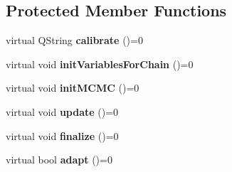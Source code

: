 \subsection*{Protected Member Functions}
\begin{DoxyCompactItemize}
\item 
\hypertarget{class_m_c_m_c_loop_a811448d75f58895a01abb4eb48967fd8}{virtual Q\-String {\bfseries calibrate} ()=0}\label{class_m_c_m_c_loop_a811448d75f58895a01abb4eb48967fd8}

\item 
\hypertarget{class_m_c_m_c_loop_a9ceca368eca19c09302c4e11d0758ca1}{virtual void {\bfseries init\-Variables\-For\-Chain} ()=0}\label{class_m_c_m_c_loop_a9ceca368eca19c09302c4e11d0758ca1}

\item 
\hypertarget{class_m_c_m_c_loop_a67b5231151f706840dbbc5a12fb3da27}{virtual void {\bfseries init\-M\-C\-M\-C} ()=0}\label{class_m_c_m_c_loop_a67b5231151f706840dbbc5a12fb3da27}

\item 
\hypertarget{class_m_c_m_c_loop_aff45437f83d2ad393bda02da235845f9}{virtual void {\bfseries update} ()=0}\label{class_m_c_m_c_loop_aff45437f83d2ad393bda02da235845f9}

\item 
\hypertarget{class_m_c_m_c_loop_adfe3500c4b7206143f9c2c6d6ec71319}{virtual void {\bfseries finalize} ()=0}\label{class_m_c_m_c_loop_adfe3500c4b7206143f9c2c6d6ec71319}

\item 
\hypertarget{class_m_c_m_c_loop_a5c02bc7060e1f90a0a1d6c71d8a5e3bb}{virtual bool {\bfseries adapt} ()=0}\label{class_m_c_m_c_loop_a5c02bc7060e1f90a0a1d6c71d8a5e3bb}

\end{DoxyCompactItemize}
